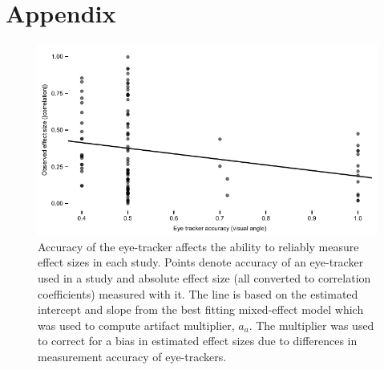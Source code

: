 \documentclass[english,natbib,man,floatsintext]{apa6}
\begin{document}




\clearpage



\FloatBarrier
\section{Appendix}
\label{appendix}


\begin{figure}
\includegraphics{ET_accuracy_effectsize}
\centering
\caption{Accuracy of the eye-tracker affects the ability to reliably measure effect sizes in each study. Points denote accuracy of an eye-tracker used in a study and absolute effect size (all converted to correlation coefficients) measured with it. The line is based on the estimated intercept and slope from the best fitting mixed-effect model which was used to compute artifact multiplier, $a_a$. The multiplier was used to correct for a bias in estimated effect sizes due to differences in measurement accuracy of eye-trackers.}
\label{fig:ET_accuracy_effectsize}
\end{figure}
\clearpage
\end{document}
